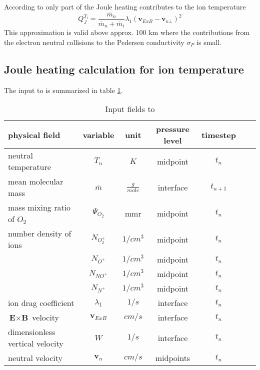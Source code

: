 According to \cite{Schunk00} only part of the Joule heating
contributes to the ion temperature
%
\begin{equation}
  Q_J^{T_i} = \frac{\overline{m}_n}{\overline{m}_n + \overline{m}_i}
  \lambda_1 (\textbf{v}_{ExB}- \textbf{v}_{n\bot})^2
\end{equation}
%
This approximation is valid above approx. 100 km where the
contributions from the electron neutral collisions to the Pedersen
conductivity $\sigma_P$ is small.
%
\subsection{Joule heating calculation for ion temperature}
%
The input to  is summarized in table
\ref{tab:input_qjoule_ti}.
%
\begin{table}[tb]
\begin{tabular}{|p{3.5cm} ||c|c|c|c|c|c|} \hline
physical field               & variable        & unit&pressure
level& timestep
\\ \hline \hline
%
neutral temperature         & $T_n$           & $K$   & midpoint  & $t_n$\\
mean molecular mass         & $\overline{m}$  & $\frac{g}{mole}$ &interface & $t_{n+1}$ \\
mass mixing ratio of $O_2$  & $\Psi_{O_2}$        & mmr  & midpoint & $t_n$\\
number density of ions       &  $N_{O_2^+}$      & $1/cm^3$  & midpoint & $t_n$\\
  {}       &  $N_{O^+}$      & $1/cm^3$  & midpoint & $t_n$ \\
 {}        &  $N_{NO^+}$     & $1/cm^3$  & midpoint & $t_n$ \\
 {}        &  $N_{N^+}$      & $1/cm^3$  & midpoint & $t_n$ \\
 ion drag coefficient        &  $\lambda_1$      & $1/s$  & interface & $t_n$ \\
 $\textbf{E}\times\textbf{B}$ velocity   &  $\textbf{v}_{ExB}$& $cm/s$ & interface & $t_n$ \\
 dimensionless vertical velocity         &  $W$               & $1/s$  & interface & $t_{n}$ \\
 neutral velocity        &  $\textbf{v}_{n}$     & $cm/s$  & midpoints & $t_n$
 \\ \hline
\end{tabular}
\caption{Input fields to }
\label{tab:input_qjoule_ti}
\end{table}

